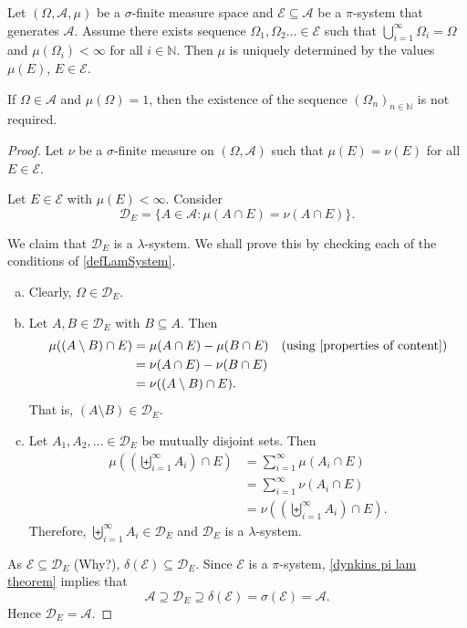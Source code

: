 \begin{lemma}
\label{uniquely defined by base pi sys}
    Let $(\Omega,\mathcal{A},\mu)$ be a $\sigma$-finite measure space and $\mathcal{E}\subseteq\mathcal{A}$ be a $\pi$-system that generates $\mathcal{A}$. Assume there exists sequence $\Omega_1,\Omega_2\ldots\in\mathcal{E}$ such that $\bigcup_{i=1}^\infty\Omega_i=\Omega$ and $\mu(\Omega_i)<\infty$ for all $i\in\mathbb{N}$. Then $\mu$ is uniquely determined by the values $\mu(E)$, $E\in\mathcal{E}$.
    
    If $\Omega\in\mathcal{A}$ and $\mu(\Omega)=1$, then the existence of the sequence $(\Omega_n)_{n\in\mathbb{N}}$ is not required.
\end{lemma}
\begin{proof}
    Let $\nu$ be a $\sigma$-finite measure on $(\Omega,\mathcal{A})$ such that $\mu(E)=\nu(E)$ for all $E\in\mathcal{E}$.
    
    \vspace{1mm}
    Let $E\in\mathcal{E}$ with $\mu(E)<\infty$. Consider
    $$\mathcal{D}_E=\{A\in\mathcal{A}: \mu(A\cap E)=\nu(A\cap E)\}.$$
    
    We claim that $\mathcal{D}_E$ is a $\lambda$-system. We shall prove this by checking each of the conditions of \cref{defLamSystem}.
    
    \begin{enumerate}[(a)]
        \item Clearly, $\Omega\in\mathcal{D}_E$.
        \item Let $A,B\in\mathcal{D}_E$ with $B\subseteq A$. Then
        \begin{align*}
            \mu((A\setminus B)\cap E) &= \mu(A\cap E) - \mu(B\cap E)\quad\text{(using \cref{properties of content})} \\
            &= \nu(A\cap E) - \nu(B\cap E) \\
            &= \nu((A\setminus B)\cap E).
        \end{align*}
        That is, $(A\setminus B)\in\mathcal{D}_E$.
        \item Let $A_1,A_2,\ldots\in\mathcal{D}_E$ be mutually disjoint sets. Then
        \begin{align*}
            \mu\left(\left(\biguplus_{i=1}^\infty A_i\right)\cap E\right) &= \sum_{i=1}^\infty \mu(A_i\cap E) \\
            &= \sum_{i=1}^\infty\nu(A_i\cap E) \\
            &= \nu\left(\left(\biguplus_{i=1}^\infty A_i\right)\cap E\right).
        \end{align*}
        Therefore, $\biguplus_{i=1}^\infty A_i\in\mathcal{D}_E$ and $\mathcal{D}_E$ is a $\lambda$-system.
    \end{enumerate}
    As $\mathcal{E}\subseteq\mathcal{D}_E$ (Why?), $\delta(\mathcal{E})\subseteq\mathcal{D}_E$. Since $\mathcal{E}$ is a $\pi$-system, \cref{dynkins pi lam theorem} implies that
    $$\mathcal{A}\supseteq\mathcal{D}_E\supseteq\delta(\mathcal{E})=\sigma(\mathcal{E})=\mathcal{A}.$$
    Hence $\mathcal{D}_E=\mathcal{A}$.
    

\end{proof}
